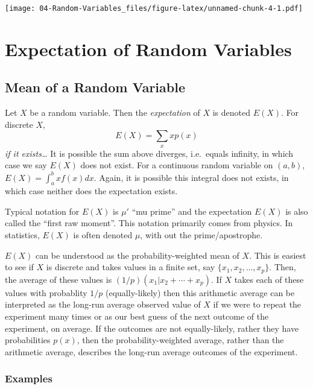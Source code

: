 \documentclass[]{book}
\begin{document}
\texttt{[image: 04-Random-Variables\_files/figure-latex/unnamed-chunk-4-1.pdf]}

\chapter{Expectation of Random
Variables}\label{expectation-of-random-variables}

\section{Mean of a Random Variable}\label{mean-of-a-random-variable}

Let \(X\) be a random variable. Then the \emph{expectation} of \(X\) is
denoted \(E(X)\). For discrete \(X\), \[E(X) = \sum_{x} x p(x)\]
\emph{if it exists\ldots{}} It is possible the sum above diverges,
i.e.~equals infinity, in which case we say \(E(X)\) does not exist. For
a continuous random variable on \((a,b)\), \(E(X) = \int_a^b x f(x)dx\).
Again, it is possible this integral does not exists, in which case
neither does the expectation exists.

Typical notation for \(E(X)\) is \(\mu'\) ``mu prime'' and the
expectation \(E(X)\) is also called the ``first raw moment''. This
notation primarily comes from physics. In statistics, \(E(X)\) is often
denoted \(\mu\), with out the prime/apostrophe.

\(E(X)\) can be understood as the probability-weighted mean of \(X\).
This is easiest to see if \(X\) is discrete and takes values in a finite
set, say \(\{x_1, x_2, \ldots, x_p\}\). Then, the average of these
values is \((1/p)(x_1 | x_2 + \cdots + x_p)\). If \(X\) takes each of
these values with probablity \(1/p\) (equally-likely) then this
arithmetic average can be interpreted as the long-run average observed
value of \(X\) if we were to repeat the experiment many times or as our
best guess of the next outcome of the experiment, on average. If the
outcomes are not equally-likely, rather they have probabilities
\(p(x)\), then the probability-weighted average, rather than the
arithmetic average, describes the long-run average outcomes of the
experiment.

\subsection{Examples}\label{examples}
\end{document}
